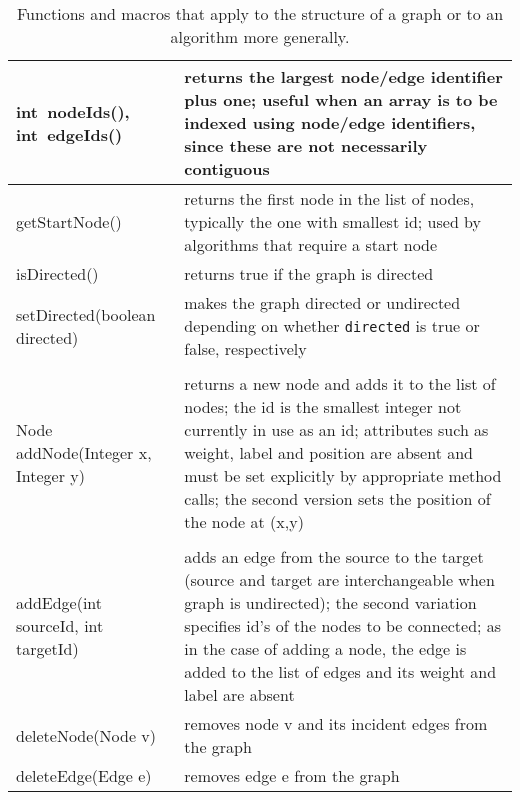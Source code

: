 \begin{table}
\begin{tabular}{| m{} | m{} |}
    \\ \hline
    \textsf{int~nodeIds()}, \textsf{int~edgeIds()}
    &
    returns the largest node/edge identifier plus one;
    useful when an array is to be indexed using node/edge identifiers,
    since these are not necessarily contiguous
    \\ \hline
    \textsf{getStartNode()}
    &
    returns the first node in the list of nodes, typically the one with smallest id;
    used by algorithms that require a start node
    \\ \hline
    \textsf{isDirected()}
    &
    returns true if the graph is directed
    \\ \hline
    \textsf{setDirected(boolean directed)}
    &
    makes the graph directed or undirected depending on whether \texttt{directed}
    is true or false, respectively
    \\ \hline
    \shortstack[l]{
      \textsf{Node addNode()}\\
      \textsf{Node addNode(Integer x, Integer y)}
    }
    &
    returns a new node and adds it to the list of nodes;
    the id is the smallest integer not currently in use as an id;
    attributes such as weight, label and position are absent and must be set explicitly
    by appropriate method calls;
    the second version sets the position of the node at \textsf{(x,y)}
    \\ \hline
    \raisebox{-5ex}{
      \shortstack[l]{
        \textsf{addEdge(Node source, Node target)}\\
        \textsf{addEdge(int sourceId, int targetId)}
      }
    }
    &
    adds an edge from the source to
    the target (source and target are interchangeable when graph is undirected);
    the second variation specifies id's of the nodes to be connected;
    as in the case of adding a node, the edge is added to the list of edges and
    its weight and label are absent
    \\ \hline
    \textsf{deleteNode(Node v)}
    &
    removes node \textsf{v} and its incident edges from the graph
    \\ \hline
    \textsf{deleteEdge(Edge e)}
    &
    removes edge \textsf{e} from the graph
    \\ \hline
  \end{tabular}
  \caption{Functions and macros that apply to the structure of a graph or to
    an algorithm more generally.}
  \label{tab:graph_functions}
\end{table}
